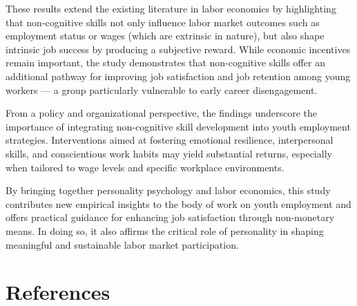 \documentclass[
]{interact}
\begin{document}
These results extend the existing literature in labor economics by
highlighting that non-cognitive skills not only influence labor market
outcomes such as employment status or wages (which are extrinsic in
nature), but also shape intrinsic job success by producing a subjective
reward. While economic incentives remain important, the study
demonstrates that non-cognitive skills offer an additional pathway for
improving job satisfaction and job retention among young workers --- a
group particularly vulnerable to early career disengagement.

From a policy and organizational perspective, the findings underscore
the importance of integrating non-cognitive skill development into youth
employment strategies. Interventions aimed at fostering emotional
resilience, interpersonal skills, and conscientious work habits may
yield substantial returns, especially when tailored to wage levels and
specific workplace environments.

By bringing together personality psychology and labor economics, this
study contributes new empirical insights to the body of work on youth
employment and offers practical guidance for enhancing job satisfaction
through non-monetary means. In doing so, it also affirms the critical
role of personality in shaping meaningful and sustainable labor market
participation.

\section*{References}\label{references}
\end{document}
